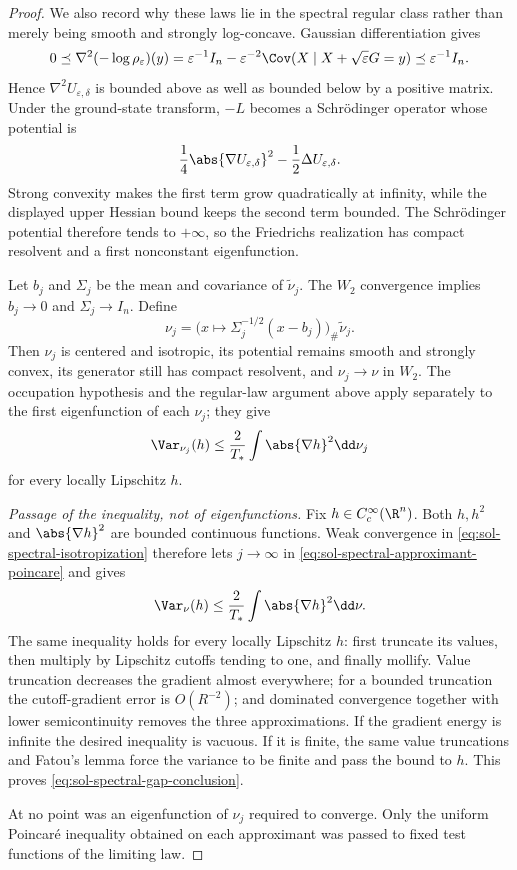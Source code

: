 \documentclass[../main.tex]{subfiles}
\begin{document}
\begin{proof}
We also record why these laws lie in the spectral regular class rather than merely being smooth
and strongly log-concave.  Gaussian differentiation gives
\[
  0\preceq\nabla^2(-\log\rho_\varepsilon)(y)
  =\varepsilon^{-1}I_n-\varepsilon^{-2}
    \Cov(X\mid X+\sqrt\varepsilon G=y)
  \preceq\varepsilon^{-1}I_n.
\]
Hence $\nabla^2U_{\varepsilon,\delta}$ is bounded above as well as bounded below by a positive
matrix.  Under the ground-state transform, $-L$ becomes a Schr\"odinger operator whose potential
is
\[
  \frac14\abs{\nabla U_{\varepsilon,\delta}}^2
  -\frac12\Delta U_{\varepsilon,\delta}.
\]
Strong convexity makes the first term grow quadratically at infinity, while the displayed upper
Hessian bound keeps the second term bounded.  The Schr\"odinger potential therefore tends to
$+\infty$, so the Friedrichs realization has compact resolvent and a first nonconstant
eigenfunction.

Let $b_j$ and $\Sigma_j$ be the mean and covariance of $\widetilde\nu_j$.  The $W_2$ convergence
implies $b_j\to0$ and $\Sigma_j\to I_n$.  Define
\begin{equation}
  \nu_j=\bigl(x\mapsto\Sigma_j^{-1/2}(x-b_j)\bigr)_\#\widetilde\nu_j.
  \label{eq:sol-spectral-isotropization}
\end{equation}
Then $\nu_j$ is centered and isotropic, its potential remains smooth and strongly convex, its
generator still has compact resolvent, and $\nu_j\to\nu$ in $W_2$.  The occupation hypothesis
and the regular-law argument above apply separately to the first eigenfunction of each $\nu_j$;
they give
\begin{equation}
  \Var_{\nu_j}(h)\le\frac2{T_*}\int\abs{\nabla h}^2\dd\nu_j
  \label{eq:sol-spectral-approximant-poincare}
\end{equation}
for every locally Lipschitz $h$.

\medskip
\noindent\emph{Passage of the inequality, not of eigenfunctions.}
Fix $h\in C_c^\infty(\R^n)$.  Both $h,h^2$ and $\abs{\nabla h}^2$ are bounded continuous
functions.  Weak convergence in \eqref{eq:sol-spectral-isotropization} therefore lets
$j\to\infty$ in \eqref{eq:sol-spectral-approximant-poincare} and gives
\[
  \Var_\nu(h)\le\frac2{T_*}\int\abs{\nabla h}^2\dd\nu.
\]
The same inequality holds for every locally Lipschitz $h$: first truncate its values, then
multiply by Lipschitz cutoffs tending to one, and finally mollify.  Value truncation decreases
the gradient almost everywhere; for a bounded truncation the cutoff-gradient error is
$O(R^{-2})$; and dominated convergence together with lower semicontinuity removes the three
approximations.  If the gradient energy is infinite the desired inequality is vacuous.  If it is
finite, the same value truncations and Fatou's lemma force the variance to be finite and pass the
bound to $h$.  This proves \eqref{eq:sol-spectral-gap-conclusion}.

At no point was an eigenfunction of $\nu_j$ required to converge.  Only the uniform Poincar\'e
inequality obtained on each approximant was passed to fixed test functions of the limiting law.
\end{proof}
\end{document}
